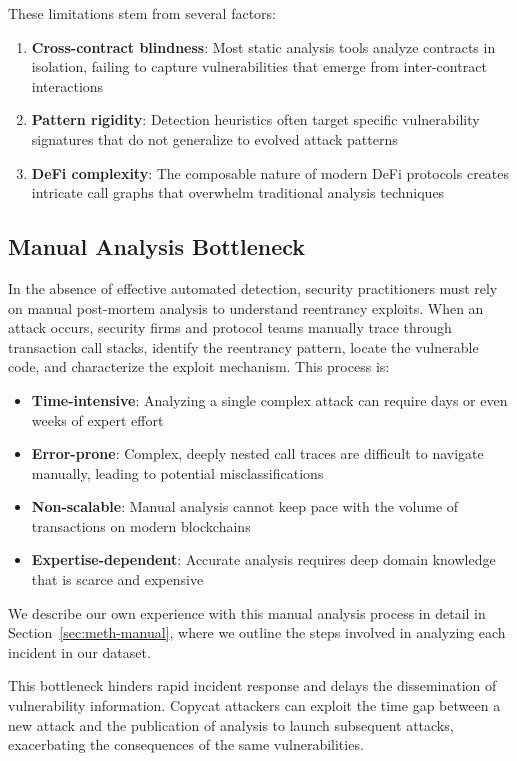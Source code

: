 These limitations stem from several factors:
\begin{enumerate}
    \item \textbf{Cross-contract blindness}: Most static analysis tools analyze contracts in isolation, failing to capture vulnerabilities that emerge from inter-contract interactions
    \item \textbf{Pattern rigidity}: Detection heuristics often target specific vulnerability signatures that do not generalize to evolved attack patterns
    \item \textbf{DeFi complexity}: The composable nature of modern DeFi protocols creates intricate call graphs that overwhelm traditional analysis techniques
\end{enumerate}

\subsection{Manual Analysis Bottleneck}

In the absence of effective automated detection, security practitioners must rely on manual post-mortem analysis to understand reentrancy exploits. When an attack occurs, security firms and protocol teams manually trace through transaction call stacks, identify the reentrancy pattern, locate the vulnerable code, and characterize the exploit mechanism. This process is:
\begin{itemize}
    \item \textbf{Time-intensive}: Analyzing a single complex attack can require days or even weeks of expert effort
    \item \textbf{Error-prone}: Complex, deeply nested call traces are difficult to navigate manually, leading to potential misclassifications
    \item \textbf{Non-scalable}: Manual analysis cannot keep pace with the volume of transactions on modern blockchains
    \item \textbf{Expertise-dependent}: Accurate analysis requires deep domain knowledge that is scarce and expensive
\end{itemize}
We describe our own experience with this manual analysis process in detail in Section~\ref{sec:meth-manual}, where we outline the steps involved in analyzing each incident in our dataset.

This bottleneck hinders rapid incident response and delays the dissemination of vulnerability information. Copycat attackers can exploit the time gap between a new attack and the publication of analysis to launch subsequent attacks, exacerbating the consequences of the same vulnerabilities.


